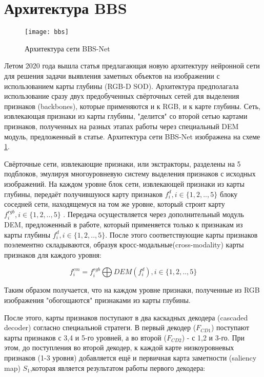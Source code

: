 \section{Архитектура BBS}

\begin{figure}[h]
    \centering
    \texttt{[image: bbs]}
    \caption{Архитектура сети BBS-Net}
    \label{fig:bbs}
\end{figure}

Летом 2020 года вышла статья \cite{BBS} предлагающая новую архитектуру нейронной сети для решения задачи выявления заметных объектов на изображении
с использованием карты глубины (RGB-D SOD). Архитектура предполагала использование сразу двух предобученных свёрточных сетей
для выделения признаков (backbones), которые применяются и к RGB, и к карте глубины. Сеть, извлекающая признаки
из карты глубины, "делится" со второй сетью картами признаков, полученных на разных этапах работы через специальный DEM модуль,
предложенный в статье. Архитектура сети BBS-Net изображена на схеме \ref{fig:bbs}.


Свёрточные сети, извлекающие признаки, или экстракторы, разделены на 5 подблоков, эмулируя многоуровневую систему выделения признаков с исходных изображений.
На каждом уровне блок сети, извлекающей признаки из карты глубины, передаёт получившуюся карту признаков $f_i^d, i \in \{1,2,..,5\}$ блоку соседней сети,
находящемуся на том же уровне, который строит карту $f_i^{rgb}, i \in \{1,2,..,5\}$ . Передача осуществляется через дополнительный модуль DEM, предложенный в работе,
который применяется только к признакам из карты глубины $f_i^d, i \in \{1,2,..,5\}$.
После этого соответствующие карты признаков поэлементно складываются, образуя кросс-модальные(cross-modality) карты признаков для каждого уровня:

\begin{equation}
    f_i^{cm} = f_i^{rgb} \bigoplus DEM(f_i^{d}), i \in \{1,2,..,5\}
    \label{eq:DEM}
\end{equation}

Таким образом получается, что на каждом уровне признаки, полученные из RGB изображения "обогощаются" признаками из карты глубины.

После этого, карты признаков поступают в два каскадных декодера (cascaded decoder) согласно специальной стратеги. В первый декодер ($F_{CD1}$)
поступают карты признаков с 3,4 и 5-го уровней, а во второй  ($F_{CD2}$) - с 1,2 и 3-го. При этом, до поступления во второй декодер, к каждой карте низкоуровневых
признаков (1-3 уровня) добавляется ещё и первичная карта заметности (saliency map) $S_1$,которая является результатом работы первого декодера:

